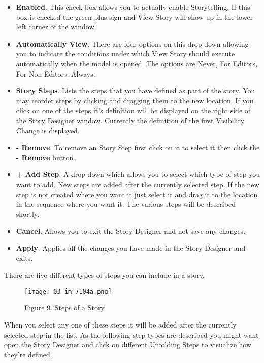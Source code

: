 \documentclass[]{memoir}
\let\Oldincludegraphics\includegraphics
\renewcommand{\includegraphics}[1]{\Oldincludegraphics[max size={\textwidth}{\textheight}]{#1}}
\begin{document}
\begin{itemize}
\itemsep1pt\parskip0pt
\item
  \textbf{Enabled}. This check box allows you to actually enable
  Storytelling. If this box is checked the green plus sign and View
  Story will show up in the lower left corner of the window.
\item
  \textbf{Automatically View}. There are four options on this drop down
  allowing you to indicate the conditions under which View Story should
  execute automatically when the model is opened. The options are Never,
  For Editors, For Non-Editors, Always.
\item
  \textbf{Story Steps}. Lists the steps that you have defined as part of
  the story. You may reorder steps by clicking and dragging them to the
  new location. If you click on one of the steps it's definition will be
  displayed on the right side of the Story Designer window. Currently
  the definition of the first Visibility Change is displayed.
\item
  \textbf{- Remove}. To remove an Story Step first click on it to select
  it then click the \textbf{- Remove} button.
\item
  \textbf{+ Add Step}. A drop down which allows you to select which type
  of step you want to add. New steps are added after the currently
  selected step. If the new step is not created where you want it just
  select it and drag it to the location in the sequence where you want
  it. The various steps will be described shortly.
\item
  \textbf{Cancel}. Allows you to exit the Story Designer and not save
  any changes.
\item
  \textbf{Apply}. Applies all the changes you have made in the Story
  Designer and exits.
\end{itemize}

There are five different types of steps you can include in a story.

\begin{figure}[htbp]
\centering
\texttt{[image: 03-im-7104a.png]}
\caption{Figure 9. Steps of a Story}
\end{figure}

When you select any one of these steps it will be added after the
currently selected step in the list. As the following step types are
described you might want open the Story Designer and click on different
Unfolding Steps to visualize how they're defined.
\end{document}
